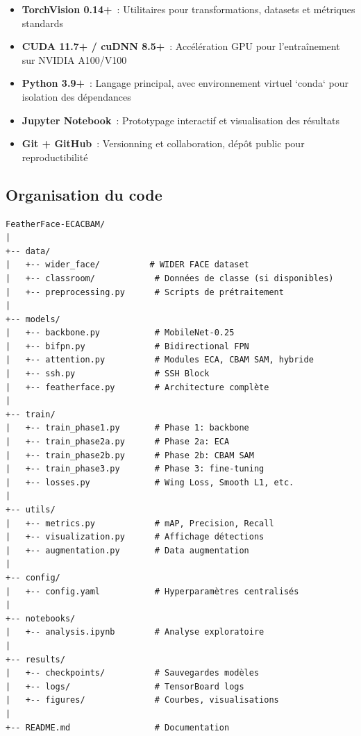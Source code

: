 \begin{onehalfspace}
\begin{itemize}
\item \textbf{TorchVision 0.14+}~: Utilitaires pour transformations, datasets et métriques standards

\item \textbf{CUDA 11.7+ / cuDNN 8.5+}~: Accélération GPU pour l'entraînement sur NVIDIA A100/V100

\item \textbf{Python 3.9+}~: Langage principal, avec environnement virtuel `conda` pour isolation des dépendances

\item \textbf{Jupyter Notebook}~: Prototypage interactif et visualisation des résultats

\item \textbf{Git + GitHub}~: Versionning et collaboration, dépôt public pour reproductibilité
\end{itemize}

\subsection{Organisation du code}

\begin{verbatim}
FeatherFace-ECACBAM/
|
+-- data/
|   +-- wider_face/          # WIDER FACE dataset
|   +-- classroom/            # Données de classe (si disponibles)
|   +-- preprocessing.py      # Scripts de prétraitement
|
+-- models/
|   +-- backbone.py           # MobileNet-0.25
|   +-- bifpn.py              # Bidirectional FPN
|   +-- attention.py          # Modules ECA, CBAM SAM, hybride
|   +-- ssh.py                # SSH Block
|   +-- featherface.py        # Architecture complète
|
+-- train/
|   +-- train_phase1.py       # Phase 1: backbone
|   +-- train_phase2a.py      # Phase 2a: ECA
|   +-- train_phase2b.py      # Phase 2b: CBAM SAM
|   +-- train_phase3.py       # Phase 3: fine-tuning
|   +-- losses.py             # Wing Loss, Smooth L1, etc.
|
+-- utils/
|   +-- metrics.py            # mAP, Precision, Recall
|   +-- visualization.py      # Affichage détections
|   +-- augmentation.py       # Data augmentation
|
+-- config/
|   +-- config.yaml           # Hyperparamètres centralisés
|
+-- notebooks/
|   +-- analysis.ipynb        # Analyse exploratoire
|
+-- results/
|   +-- checkpoints/          # Sauvegardes modèles
|   +-- logs/                 # TensorBoard logs
|   +-- figures/              # Courbes, visualisations
|
+-- README.md                 # Documentation
\end{verbatim}


\end{onehalfspace}
